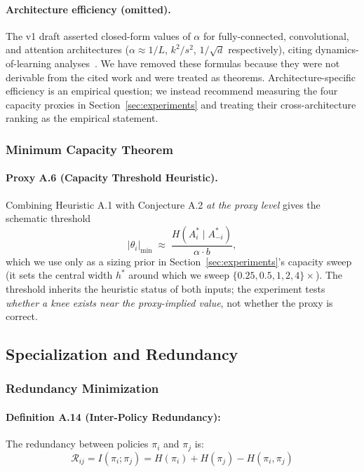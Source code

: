\documentclass[10pt, letterpaper]{article}
\begin{document}
\paragraph{Architecture efficiency (omitted).} The v1 draft asserted closed-form values of $\alpha$ for fully-connected, convolutional, and attention architectures ($\alpha \approx 1/L$, $k^2/s^2$, $1/\sqrt{d}$ respectively), citing dynamics-of-learning analyses~\cite{saxe2019}. We have removed these formulas because they were not derivable from the cited work and were treated as theorems. Architecture-specific efficiency is an empirical question; we instead recommend measuring the four capacity proxies in Section~\ref{sec:experiments} and treating their cross-architecture ranking as the empirical statement.

\subsubsection{Minimum Capacity Theorem}

\paragraph{Proxy A.6 (Capacity Threshold Heuristic).} Combining Heuristic A.1 with Conjecture A.2 \emph{at the proxy level} gives the schematic threshold
\[|\theta_i|_\text{min} \;\approx\; \frac{H(A_i^*\mid A_{-i}^*)}{\alpha \cdot b},\]
which we use only as a sizing prior in Section~\ref{sec:experiments}'s capacity sweep (it sets the central width $h^*$ around which we sweep $\{0.25,0.5,1,2,4\}\times$). The threshold inherits the heuristic status of both inputs; the experiment tests \emph{whether a knee exists near the proxy-implied value}, not whether the proxy is correct.

\subsection{Specialization and Redundancy}

\subsubsection{Redundancy Minimization}

\paragraph{Definition A.14 (Inter-Policy Redundancy):} The redundancy between policies $\pi_i$ and $\pi_j$ is:
\[\mathcal{R}_{ij} = I(\pi_i; \pi_j) = H(\pi_i) + H(\pi_j) - H(\pi_i, \pi_j)\]
\end{document}

